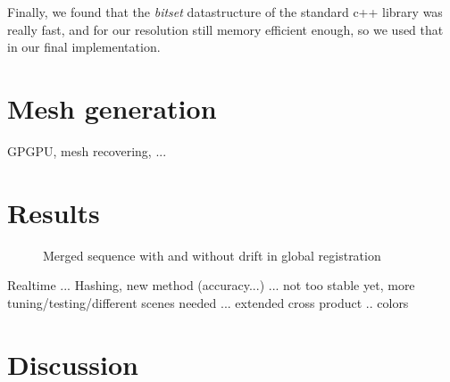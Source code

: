 \documentclass[10pt,twocolumn,letterpaper]{article}
\begin{document}
Finally, we found that the \textit{bitset} datastructure of the standard c++ library was really fast, and for our resolution still memory efficient enough,
so we used that in our final implementation.

\section{Mesh generation}
GPGPU, mesh recovering, ...

\section{Results}
\begin{figure}
  \centering
  \caption{Merged sequence with and without drift in global registration}
  \label{fig:globalregistration}
\end{figure}


Realtime ... Hashing, new method (accuracy...) ... not too stable yet, more tuning/testing/different scenes needed ... extended cross product .. colors

\section{Discussion}
\end{document}
